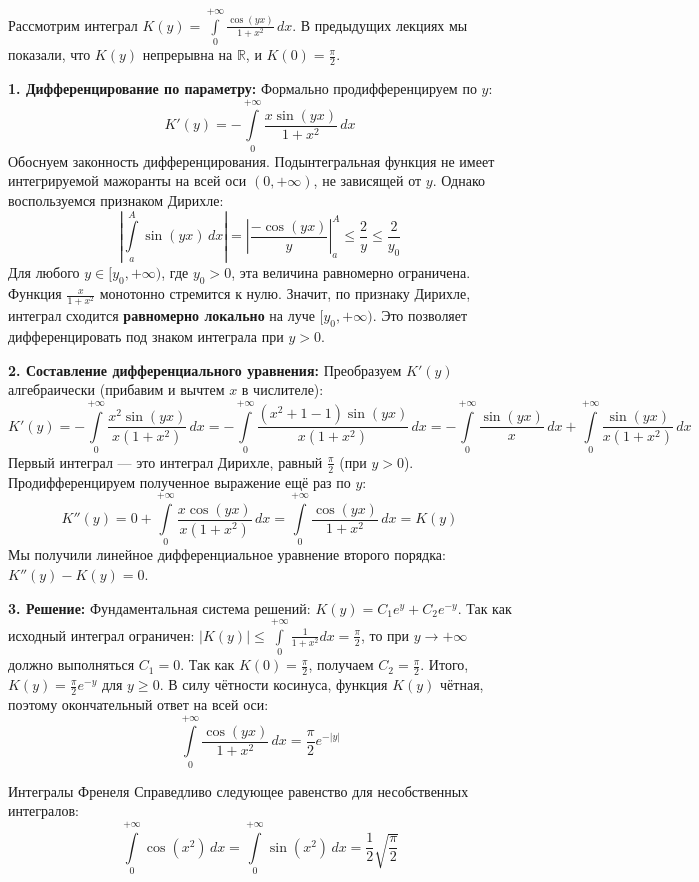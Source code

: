 \documentclass[12pt,a4paper]{article}
\begin{document}
\begin{Example}
Рассмотрим интеграл $K(y) = \int\limits_0^{+\infty} \frac{\cos(yx)}{1+x^2} \, dx$.
В предыдущих лекциях мы показали, что $K(y)$ непрерывна на $\mathbb{R}$, и $K(0) = \frac{\pi}{2}$.

\textbf{1. Дифференцирование по параметру:}
Формально продифференцируем по $y$:
$$ K'(y) = -\int\limits_0^{+\infty} \frac{x \sin(yx)}{1+x^2} \, dx $$
Обоснуем законность дифференцирования. Подынтегральная функция не имеет интегрируемой мажоранты на всей оси $(0, +\infty)$, не зависящей от $y$. Однако воспользуемся признаком Дирихле:
$$ \left| \int\limits_a^A \sin(yx) \, dx \right| = \left| \frac{-\cos(yx)}{y} \right|_a^A \le \frac{2}{y} \le \frac{2}{y_0} $$
Для любого $y \in [y_0, +\infty)$, где $y_0 > 0$, эта величина равномерно ограничена. Функция $\frac{x}{1+x^2}$ монотонно стремится к нулю. Значит, по признаку Дирихле, интеграл сходится \textbf{равномерно локально} на луче $[y_0, +\infty)$. Это позволяет дифференцировать под знаком интеграла при $y > 0$.

\textbf{2. Составление дифференциального уравнения:}
Преобразуем $K'(y)$ алгебраически (прибавим и вычтем $x$ в числителе):
$$ K'(y) = -\int\limits_0^{+\infty} \frac{x^2 \sin(yx)}{x(1+x^2)} \, dx = -\int\limits_0^{+\infty} \frac{(x^2+1-1) \sin(yx)}{x(1+x^2)} \, dx = -\int\limits_0^{+\infty} \frac{\sin(yx)}{x} \, dx + \int\limits_0^{+\infty} \frac{\sin(yx)}{x(1+x^2)} \, dx $$
Первый интеграл — это интеграл Дирихле, равный $\frac{\pi}{2}$ (при $y > 0$).
Продифференцируем полученное выражение ещё раз по $y$:
$$ K''(y) = 0 + \int\limits_0^{+\infty} \frac{x \cos(yx)}{x(1+x^2)} \, dx = \int\limits_0^{+\infty} \frac{\cos(yx)}{1+x^2} \, dx = K(y) $$
Мы получили линейное дифференциальное уравнение второго порядка: $K''(y) - K(y) = 0$.

\textbf{3. Решение:}
Фундаментальная система решений: $K(y) = C_1 e^y + C_2 e^{-y}$.
Так как исходный интеграл ограничен: $|K(y)| \le \int\limits_0^{+\infty} \frac{1}{1+x^2} dx = \frac{\pi}{2}$, то при $y \to +\infty$ должно выполняться $C_1 = 0$.
Так как $K(0) = \frac{\pi}{2}$, получаем $C_2 = \frac{\pi}{2}$.
Итого, $K(y) = \frac{\pi}{2} e^{-y}$ для $y \ge 0$. В силу чётности косинуса, функция $K(y)$ чётная, поэтому окончательный ответ на всей оси:
$$ \int\limits_0^{+\infty} \frac{\cos(yx)}{1+x^2} \, dx = \frac{\pi}{2} e^{-|y|} $$
\end{Example}


\begin{Theorem}{Интегралы Френеля}{}
Справедливо следующее равенство для несобственных интегралов:
$$ \int\limits_0^{+\infty} \cos(x^2) \, dx = \int\limits_0^{+\infty} \sin(x^2) \, dx = \frac{1}{2}\sqrt{\frac{\pi}{2}} $$
\end{Theorem}
\end{document}
